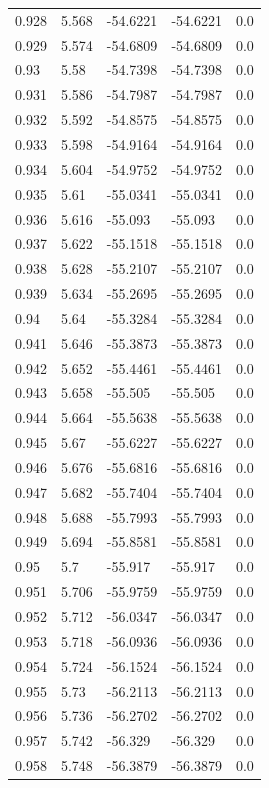 \begin{table}[H]
\begin{tabular}{lllll}
0.928 & 5.568 & -54.6221 & -54.6221 & 0.0 \\
0.929 & 5.574 & -54.6809 & -54.6809 & 0.0 \\
0.93 & 5.58 & -54.7398 & -54.7398 & 0.0 \\
0.931 & 5.586 & -54.7987 & -54.7987 & 0.0 \\
0.932 & 5.592 & -54.8575 & -54.8575 & 0.0 \\
0.933 & 5.598 & -54.9164 & -54.9164 & 0.0 \\
0.934 & 5.604 & -54.9752 & -54.9752 & 0.0 \\
0.935 & 5.61 & -55.0341 & -55.0341 & 0.0 \\
0.936 & 5.616 & -55.093 & -55.093 & 0.0 \\
0.937 & 5.622 & -55.1518 & -55.1518 & 0.0 \\
0.938 & 5.628 & -55.2107 & -55.2107 & 0.0 \\
0.939 & 5.634 & -55.2695 & -55.2695 & 0.0 \\
0.94 & 5.64 & -55.3284 & -55.3284 & 0.0 \\
0.941 & 5.646 & -55.3873 & -55.3873 & 0.0 \\
0.942 & 5.652 & -55.4461 & -55.4461 & 0.0 \\
0.943 & 5.658 & -55.505 & -55.505 & 0.0 \\
0.944 & 5.664 & -55.5638 & -55.5638 & 0.0 \\
0.945 & 5.67 & -55.6227 & -55.6227 & 0.0 \\
0.946 & 5.676 & -55.6816 & -55.6816 & 0.0 \\
0.947 & 5.682 & -55.7404 & -55.7404 & 0.0 \\
0.948 & 5.688 & -55.7993 & -55.7993 & 0.0 \\
0.949 & 5.694 & -55.8581 & -55.8581 & 0.0 \\
0.95 & 5.7 & -55.917 & -55.917 & 0.0 \\
0.951 & 5.706 & -55.9759 & -55.9759 & 0.0 \\
0.952 & 5.712 & -56.0347 & -56.0347 & 0.0 \\
0.953 & 5.718 & -56.0936 & -56.0936 & 0.0 \\
0.954 & 5.724 & -56.1524 & -56.1524 & 0.0 \\
0.955 & 5.73 & -56.2113 & -56.2113 & 0.0 \\
0.956 & 5.736 & -56.2702 & -56.2702 & 0.0 \\
0.957 & 5.742 & -56.329 & -56.329 & 0.0 \\
0.958 & 5.748 & -56.3879 & -56.3879 & 0.0 \\

\end{tabular}
\end{table}

